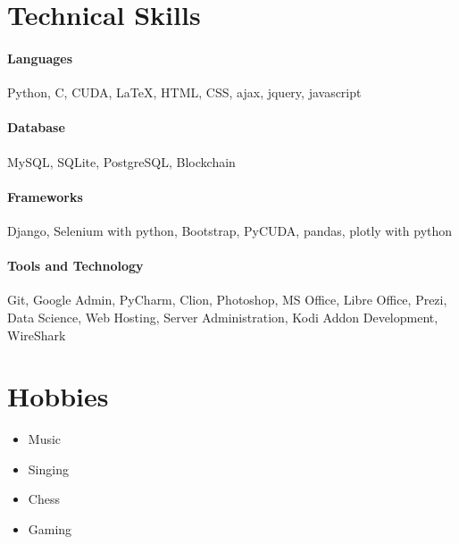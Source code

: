 \documentclass[a4paper, 14pt]{article}
\begin{document}
	\section*{Technical Skills}

	\paragraph{Languages} Python, C, CUDA, LaTeX, HTML, CSS, ajax, jquery, javascript
	\paragraph{Database} MySQL, SQLite, PostgreSQL, Blockchain
	\paragraph{Frameworks} Django, Selenium with python, Bootstrap, PyCUDA, pandas, plotly with python
	\paragraph{Tools and Technology} Git, Google Admin, PyCharm, Clion, Photoshop, MS Office, Libre Office, Prezi,
	Data Science, Web Hosting, Server Administration, Kodi Addon Development, WireShark
	
	\section*{Hobbies}
	\begin{itemize}
		\item Music
		\item Singing
		\item Chess
		\item Gaming
	\end{itemize}
\end{document}
